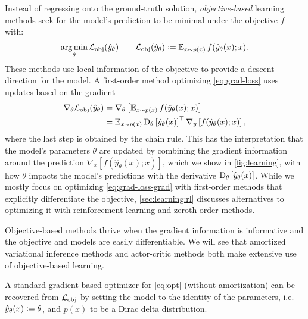 \documentclass[twoside,11pt]{article}
\newcommand{\ie}{i.e.\xspace}
\begin{document}
Instead of regressing onto the ground-truth solution,
\emph{objective-based} learning methods seek for
the model's prediction to be minimal under the objective $f$ with:
\begin{equation}
  \operatorname*{arg\,min}_\theta {\mathcal{L}}_{\rm obj}(\hat y_\theta) \qquad {\mathcal{L}}_{\rm obj}(\hat y_\theta) \vcentcolon= \operatorname{\mathbb{E}}_{x \sim p(x)} f(\hat y_\theta(x); x).
\label{eq:grad-loss}
\end{equation}
These methods use local information of the objective
to provide a descent direction for the model.
A first-order method optimizing \cref{eq:grad-loss} uses
updates based on the gradient
\begin{equation}
  \begin{aligned}
  \nabla_\theta {\mathcal{L}}_{\rm obj}(\hat y_\theta) &= \nabla_\theta \left[ \operatorname{\mathbb{E}}_{x\sim p(x)}f(\hat y_\theta(x); x)\right] \\
  &= \operatorname{\mathbb{E}}_{x\sim p(x)} \mathrm{D}_\theta\left[ \hat y_\theta(x)\right]^\top
  \nabla_{y} \left[ f(\hat y_\theta(x); x) \right],
  \end{aligned}
  \label{eq:grad-loss-grad}
\end{equation}
where the last step is obtained by the chain rule.
This has the interpretation that the model's parameters $\theta$
are updated by combining the gradient information around the prediction
$\nabla_{x} \left[ f(\hat y_\theta(x); x) \right]$,
which we show in \cref{fig:learning},
with how $\theta$ impacts the model's predictions with the derivative
$\mathrm{D}_\theta\left[ \hat y_\theta(x)\right]$.
While we mostly focus on optimizing
\cref{eq:grad-loss-grad} with
first-order methods that explicitly differentiate
the objective, \cref{sec:learning:rl} discusses alternatives
to optimizing it with reinforcement learning and
zeroth-order methods.

Objective-based methods thrive when the gradient information
is informative and the objective and models are easily differentiable.
We will see that amortized variational inference methods and
actor-critic methods both make extensive use of
objective-based learning.

\begin{remark}
  A standard gradient-based optimizer for \cref{eq:opt} (without amortization)
  can be recovered from ${\mathcal{L}}_{\rm obj}$ by setting the model to the identity
  of the parameters, \ie $\hat y_\theta(x)\vcentcolon=\theta$, and $p(x)$ to be a
  Dirac delta distribution.
  \label{remark:obj-loss}
\end{remark}
\end{document}
